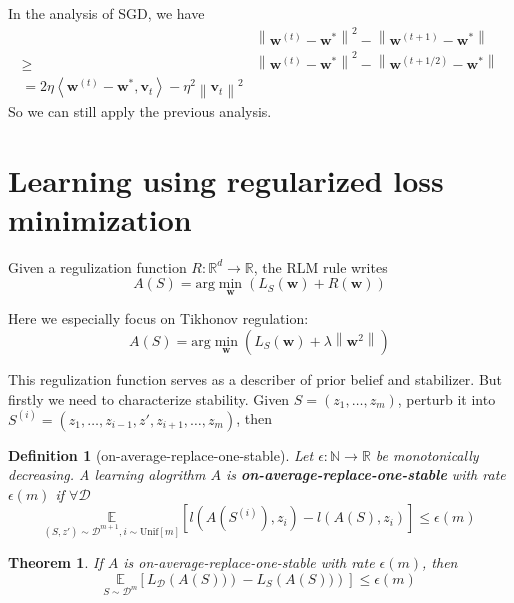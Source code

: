 \documentclass{book}
\newcommand{\R}{\mathbb{R}}
\newcommand{\N}{\mathbb{N}}
\newcommand{\D}{\mathcal{D}}
\newtheorem{Thm}{Theorem}[section]
\newtheorem{Def}{Definition}[section]
\begin{document}
In the analysis of SGD, we have 
\begin{align}
  &\left\| \mathbf{w}^{(t)}-\mathbf{w}^{*} \right\|^2-\left\| \mathbf{w}^{(t+1)}-\mathbf{w}^{*} \right\|\\
  \geq &\left\| \mathbf{w}^{(t)}-\mathbf{w}^{*} \right\|^2-\left\| \mathbf{w}^{(t+1/2)}-\mathbf{w}^{*} \right\| \\
  =2\eta \left\langle \mathbf{w}^{(t)}-\mathbf{w}^{*},\mathbf{v}_t \right\rangle- \eta^2 \left\| \mathbf{v}_{t} \right\|^{2}
\end{align}
So we can still apply the previous analysis.

\section{Learning using regularized loss minimization}
Given a regulization function $R: \R^{d}\to\R$, the RLM rule writes 
\begin{equation}
A(S)= \mathrm{arg}\min_{\mathbf{w}}(L_{S}\left( \mathbf{w}\right)+R(\mathbf{w}))
\end{equation}

Here we especially focus on Tikhonov regulation: 
\begin{equation}
A(S)=\mathrm{arg}\min_{\mathbf{w}}(L_{S}\left( \mathbf{w}\right)+\lambda \left\| \mathbf{w}^{2} \right\|)
\end{equation}

This regulization function serves as a describer of prior belief and stabilizer. But firstly we need to characterize stability. Given $S=\left(z_{1},\dots,z_{m}\right)$, perturb it into $S^{(i)}=\left(z_{1},\dots,z_{i-1}, z', z_{i+1},\dots, z_m\right)$, then
\begin{Def}[on-average-replace-one-stable]
  Let $\epsilon:\N\to\R$ be monotonically decreasing. A learning alogrithm $A$ is \textbf{on-average-replace-one-stable} with rate $\epsilon(m)$ if $\forall\D$  
\begin{equation}
\underset{(S,z')\sim\D^{m+1}, i\sim \mathrm{Unif}\left[ m \right]}{\mathbb{E}}\left[ l(A(S^{(i)}),z_i)-l(A(S),z_i)\right]\leq \epsilon(m) 
\end{equation}
\end{Def}

\begin{Thm}
  If $A$ is on-average-replace-one-stable with rate $\epsilon(m)$, then 
\begin{equation}
\underset{S\sim \D^{m}}{\mathbb{E}}\left[ L_{\D}\left( A(S))\right)-L_{S}\left( A(S))\right)\right]\leq \epsilon(m) 
\end{equation}
\end{Thm}
\end{document}
